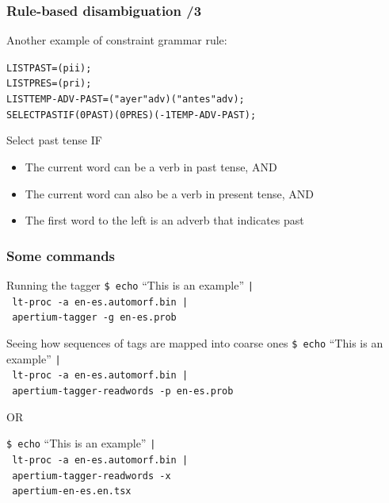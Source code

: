 \documentclass{beamer} %
\begin{document}
\begin{frame}
  \frametitle{Rule-based disambiguation /3}

  \begin{exampleblock}{Another example of constraint grammar rule:}
    \begin{small}
    \begin{alltt}
      LIST PAST = (pii);\\
      LIST PRES = (pri);\\
      LIST TEMP-ADV-PAST = ("ayer" adv) ("antes" adv);\\

      SELECT PAST IF (0 PAST) (0 PRES) (-1 TEMP-ADV-PAST);
    \end{alltt}
    \end{small}
  \end{exampleblock}

  \begin{block}{}
    Select past tense IF
    \begin{itemize}
    \item The current word can be a verb in past tense, AND
    \item The current word can also be a verb in present tense, AND
    \item The first word to the left is an adverb that indicates past
    \end{itemize}
  \end{block}
\end{frame}


\begin{frame}
  \frametitle{Some commands}

  \begin{block}{Running the tagger}
    \texttt{\$ echo} ``This is an example'' \texttt{|}\\
    \texttt{ lt-proc -a en-es.automorf.bin |}\\
    \texttt{ apertium-tagger -g en-es.prob}
  \end{block}

  \begin{block}{Seeing how sequences of tags are mapped into coarse ones}
    \texttt{\$ echo} ``This is an example'' \texttt{|}\\
    \texttt{ lt-proc -a en-es.automorf.bin |}\\
    \texttt{ apertium-tagger-readwords -p en-es.prob} 
    
    OR
    
    \texttt{\$ echo} ``This is an example'' \texttt{|}\\
    \texttt{ lt-proc -a en-es.automorf.bin |}\\
    \texttt{ apertium-tagger-readwords -x } \\
    \texttt{ apertium-en-es.en.tsx}
  \end{block}
\end{frame}
\end{document}
